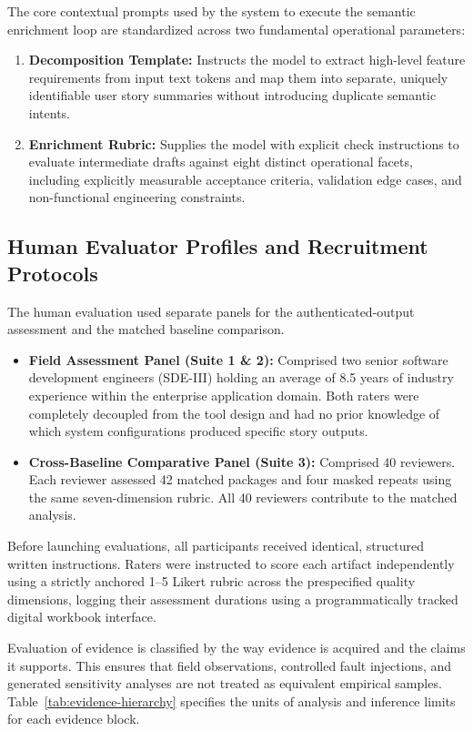 \documentclass[manuscript,review]{acmart}
\begin{document}
The core contextual prompts used by the system to execute the semantic enrichment loop are standardized across two fundamental operational parameters:
\begin{enumerate}
    \item \textbf{Decomposition Template:} Instructs the model to extract high-level feature requirements from input text tokens and map them into separate, uniquely identifiable user story summaries without introducing duplicate semantic intents.
    \item \textbf{Enrichment Rubric:} Supplies the model with explicit check instructions to evaluate intermediate drafts against eight distinct operational facets, including explicitly measurable acceptance criteria, validation edge cases, and non-functional engineering constraints.
\end{enumerate}

\subsection{Human Evaluator Profiles and Recruitment Protocols}
The human evaluation used separate panels for the authenticated-output assessment and the matched baseline comparison.
\begin{itemize}
    \item \textbf{Field Assessment Panel (Suite 1 \& 2):} Comprised two senior software development engineers (SDE-III) holding an average of 8.5 years of industry experience within the enterprise application domain. Both raters were completely decoupled from the tool design and had no prior knowledge of which system configurations produced specific story outputs.
    \item \textbf{Cross-Baseline Comparative Panel (Suite 3):} Comprised 40 reviewers. Each reviewer assessed 42 matched packages and four masked repeats using the same seven-dimension rubric. All 40 reviewers contribute to the matched analysis.
\end{itemize}
Before launching evaluations, all participants received identical, structured written instructions. Raters were instructed to score each artifact independently using a strictly anchored 1--5 Likert rubric across the prespecified quality dimensions, logging their assessment durations using a programmatically tracked digital workbook interface.

Evaluation of evidence is classified by the way evidence is acquired and the claims it supports. This ensures that field observations, controlled fault injections, and generated sensitivity analyses are not treated as equivalent empirical samples. Table~\ref{tab:evidence-hierarchy} specifies the units of analysis and inference limits for each evidence block.
\end{document}
